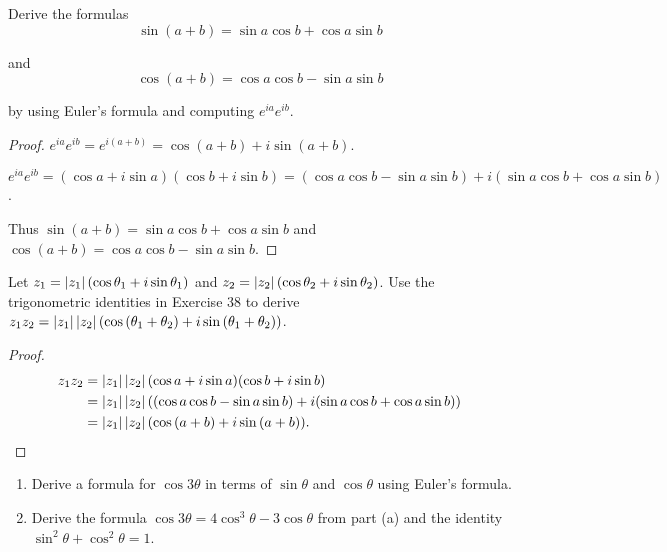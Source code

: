 \begin{exercise}
    Derive the formulas
    \[
        \sin(a + b) = \sin a\cos b + \cos a\sin b
    \]

    and
    \[
        \cos(a + b) = \cos a\cos b - \sin a\sin b
    \]

    by using Euler's formula and computing $e^{ia}e^{ib}$.
\end{exercise}

\begin{proof}
    $e^{ia}e^{ib} = e^{i(a+b)} = \cos(a+b) + i\sin(a+b)$.

    $e^{ia}e^{ib} = (\cos a + i\sin a)(\cos b + i\sin b) = (\cos a\cos b - \sin a\sin b) + i(\sin a\cos b + \cos a\sin b)$.

    Thus $\sin(a + b) = \sin a\cos b + \cos a\sin b$ and $\cos(a + b) = \cos a\cos b - \sin a\sin b$.
\end{proof}

\begin{exercise}
    Let $z_{1} = \left\vert{z_{1}}\right\vert(\cos{\theta_{1}} + i\sin{\theta_{1}})$ and $z_{2} = \left\vert{z_{2}}\right\vert(\cos{\theta_{2}} + i\sin{\theta_{2}})$. Use the trigonometric identities in Exercise 38 to derive $z_{1}z_{2} = \left\vert{z_{1}}\right\vert\left\vert{z_{2}}\right\vert(\cos{(\theta_{1} + \theta_{2})} + i\sin{(\theta_{1} + \theta_{2})})$.
\end{exercise}

\begin{proof}
    \begin{align*}
        z_{1}z_{2} & = \left\vert{z_{1}}\right\vert\left\vert{z_{2}}\right\vert(\cos a + i\sin a)(\cos b + i\sin b)                             \\
                   & = \left\vert{z_{1}}\right\vert\left\vert{z_{2}}\right\vert((\cos a\cos b - \sin a\sin b) + i(\sin a\cos b + \cos a\sin b)) \\
                   & = \left\vert{z_{1}}\right\vert\left\vert{z_{2}}\right\vert(\cos{(a+b)} + i\sin{(a+b)}).
    \end{align*}
\end{proof}

\begin{exercise}
    \begin{enumerate}[topsep=0pt,itemsep=0pt,label={\textbf{\alph*.}}]
        \item Derive a formula for $\cos{3\theta}$ in terms of $\sin{\theta}$ and $\cos{\theta}$ using Euler's formula.
        \item Derive the formula $\cos{3\theta} = 4\cos^{3}{\theta} - 3\cos{\theta}$ from part (a) and the identity $\sin^{2}{\theta} + \cos^{2}{\theta} = 1$.
    \end{enumerate}
\end{exercise}

